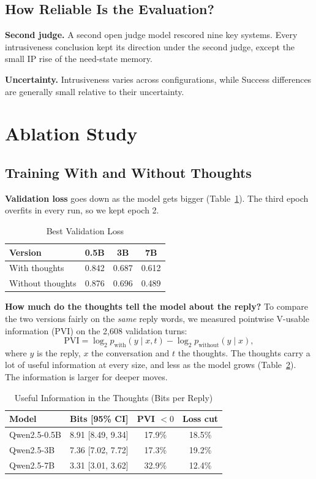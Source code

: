 \documentclass[journal]{IEEEtran}
\newcommand{\tsize}{\footnotesize}
\begin{document}
\subsection{How Reliable Is the Evaluation?}
\textbf{Second judge.} A second open judge model rescored nine key systems. Every intrusiveness conclusion kept its direction under the second judge, except the small IP rise of the need-state memory.

\textbf{Uncertainty.} Intrusiveness varies across configurations, while Success differences are generally small relative to their uncertainty.

\FloatBarrier
\section{Ablation Study}
\subsection{Training With and Without Thoughts}\label{sec:a-thoughts}
\textbf{Validation loss} goes down as the model gets bigger (Table~\ref{tab:loss}). The third epoch overfits in every run, so we kept epoch 2.

\begin{table}[!htb]
\caption{Best Validation Loss}
\label{tab:loss}
\centering\tsize
\begin{tabular}{@{}lccc@{}}
\toprule
Version & 0.5B & 3B & 7B\\
\midrule
With thoughts & 0.842 & 0.687 & 0.612\\
Without thoughts & 0.876 & 0.696 & 0.489\\
\bottomrule
\end{tabular}
\end{table}



\textbf{How much do the thoughts tell the model about the reply?} To compare the two versions fairly on the \emph{same} reply words, we measured pointwise V-usable information (PVI) on the 2,608 validation turns:
\[
\text{PVI}=\log_2 p_{\text{with}}(y\mid x,t)-\log_2 p_{\text{without}}(y\mid x),
\]
where $y$ is the reply, $x$ the conversation and $t$ the thoughts. The thoughts carry a lot of useful information at every size, and less as the model grows (Table~\ref{tab:pvi}). The information is larger for deeper moves.

\begin{table}[!htb]
\caption{Useful Information in the Thoughts (Bits per Reply)}
\label{tab:pvi}
\centering\tsize
\begin{tabular}{@{}lccc@{}}
\toprule
Model & Bits [95\% CI] & PVI $<0$ & Loss cut\\
\midrule
Qwen2.5-0.5B & 8.91 [8.49, 9.34] & 17.9\% & 18.5\%\\
Qwen2.5-3B & 7.36 [7.02, 7.72] & 17.3\% & 19.2\%\\
Qwen2.5-7B & 3.31 [3.01, 3.62] & 32.9\% & 12.4\%\\
\bottomrule
\end{tabular}
\end{table}
\end{document}
